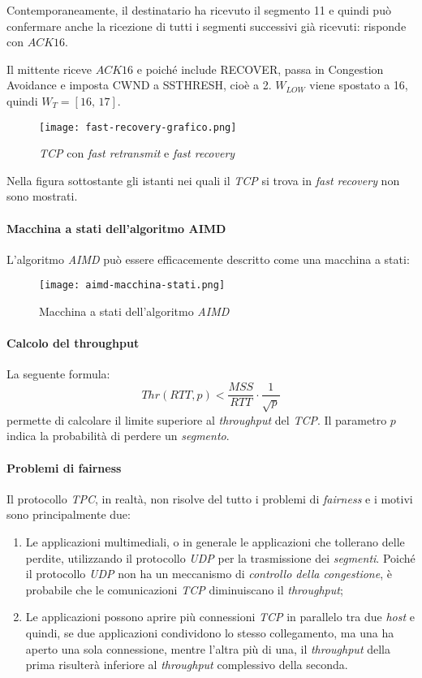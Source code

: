 \begin{eg}
    Contemporaneamente, il destinatario ha ricevuto il segmento 11 e
    quindi può confermare anche la ricezione di tutti i segmenti successivi
    già ricevuti: risponde con $ACK16$.

    Il mittente riceve $ACK16$ e poiché include RECOVER, passa in Congestion
    Avoidance e imposta CWND a SSTHRESH, cioè a 2. $W_{LOW}$ viene spostato a
    16, quindi $W_T=[16,\,17]$.
\end{eg}

\begin{figure}[ht]
    \centering
    \texttt{[image: fast-recovery-grafico.png]}
    \caption{\emph{TCP} con \emph{fast retransmit} e \emph{fast recovery}}
\end{figure}
\begin{note}
    Nella figura sottostante gli istanti nei quali il \emph{TCP} si trova in
    \emph{fast recovery} non sono mostrati.
\end{note}
\newpage
\paragraph{Macchina a stati dell'algoritmo AIMD}
L'algoritmo \emph{AIMD} può essere efficacemente descritto come una macchina a
stati:
\begin{figure}[h!]
    \centering
    \texttt{[image: aimd-macchina-stati.png]}
    \caption{Macchina a stati dell'algoritmo \emph{AIMD}}
\end{figure}

\paragraph{Calcolo del throughput}
La seguente formula:
\[Thr(RTT,p)<\frac{MSS}{RTT}\cdot\frac{1}{\sqrt{p}}\]
permette di calcolare il limite superiore al \emph{throughput} del \emph{TCP}.
Il parametro $p$ indica la probabilità di perdere un \emph{segmento}.

\paragraph{Problemi di fairness}
Il protocollo \emph{TPC}, in realtà, non risolve del tutto i problemi di
\emph{fairness} e i motivi sono principalmente due:
\begin{enumerate}
    \item Le applicazioni multimediali, o in generale le applicazioni che
    tollerano delle perdite, utilizzando il protocollo \emph{UDP} per la
    trasmissione dei \emph{segmenti}. Poiché il protocollo \emph{UDP} non
    ha un meccanismo di \emph{controllo della congestione}, è probabile che
    le comunicazioni \emph{TCP} diminuiscano il \emph{throughput};
    \item Le applicazioni possono aprire più connessioni \emph{TCP} in
    parallelo tra due \emph{host} e quindi, se due applicazioni condividono
    lo stesso collegamento, ma una ha aperto una sola connessione, mentre
    l'altra più di una, il \emph{throughput} della prima risulterà inferiore
    al \emph{throughput} complessivo della seconda.
\end{enumerate}

